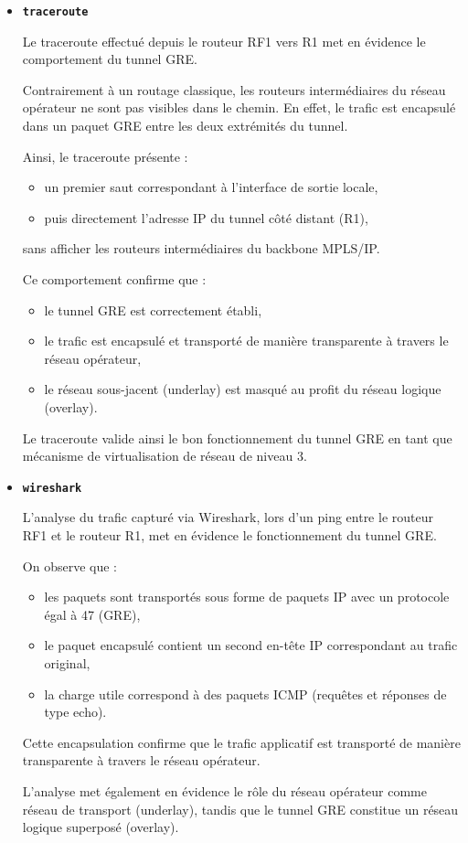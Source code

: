 \documentclass[12pt,a4paper, oneside]{memoir}
\begin{document}
\begin{itemize}
	\item \texttt{\textbf{traceroute}}
	
	Le traceroute effectué depuis le routeur RF1 vers R1 met en évidence le comportement du tunnel GRE.

Contrairement à un routage classique, les routeurs intermédiaires du réseau opérateur ne sont pas visibles dans le chemin. En effet, le trafic est encapsulé dans un paquet GRE entre les deux extrémités du tunnel.

Ainsi, le traceroute présente :
\begin{itemize}
	\item un premier saut correspondant à l’interface de sortie locale,
	\item puis directement l’adresse IP du tunnel côté distant (R1),
\end{itemize}

sans afficher les routeurs intermédiaires du backbone MPLS/IP.

Ce comportement confirme que :
\begin{itemize}
	\item le tunnel GRE est correctement établi,
	\item le trafic est encapsulé et transporté de manière transparente à travers le réseau opérateur,
	\item le réseau sous-jacent (underlay) est masqué au profit du réseau logique (overlay).
\end{itemize}

Le traceroute valide ainsi le bon fonctionnement du tunnel GRE en tant que mécanisme de virtualisation de réseau de niveau 3.


\item \texttt{\textbf{wireshark}}

L’analyse du trafic capturé via Wireshark, lors d’un ping entre le routeur RF1 et le routeur R1, met en évidence le fonctionnement du tunnel GRE.

On observe que :

\begin{itemize}
	\item les paquets sont transportés sous forme de paquets IP avec un protocole égal à 47 (GRE),
	\item le paquet encapsulé contient un second en-tête IP correspondant au trafic original,
	\item la charge utile correspond à des paquets ICMP (requêtes et réponses de type echo).
\end{itemize}

Cette encapsulation confirme que le trafic applicatif est transporté de manière transparente à travers le réseau opérateur.

L’analyse met également en évidence le rôle du réseau opérateur comme réseau de transport (underlay), tandis que le tunnel GRE constitue un réseau logique superposé (overlay).
\end{itemize}
\end{document}
